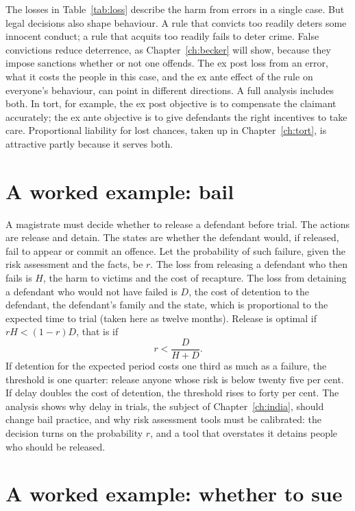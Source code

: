 The losses in Table~\ref{tab:loss} describe the harm from errors in a single case. But legal decisions also shape behaviour. A rule that convicts too readily deters some innocent conduct; a rule that acquits too readily fails to deter crime. False convictions reduce deterrence, as Chapter~\ref{ch:becker} will show, because they impose sanctions whether or not one offends. The ex post loss from an error, what it costs the people in this case, and the ex ante effect of the rule on everyone's behaviour, can point in different directions. A full analysis includes both. In tort, for example, the ex post objective is to compensate the claimant accurately; the ex ante objective is to give defendants the right incentives to take care. Proportional liability for lost chances, taken up in Chapter~\ref{ch:tort}, is attractive partly because it serves both.

\section{A worked example: bail}

A magistrate must decide whether to release a defendant before trial. The actions are release and detain. The states are whether the defendant would, if released, fail to appear or commit an offence. Let the probability of such failure, given the risk assessment and the facts, be $r$. The loss from releasing a defendant who then fails is $H$, the harm to victims and the cost of recapture. The loss from detaining a defendant who would not have failed is $D$, the cost of detention to the defendant, the defendant's family and the state, which is proportional to the expected time to trial (taken here as twelve months). Release is optimal if $rH < (1-r)D$, that is if
\begin{equation}
r < \frac{D}{H + D}.
\end{equation}
If detention for the expected period costs one third as much as a failure, the threshold is one quarter: release anyone whose risk is below twenty five per cent. If delay doubles the cost of detention, the threshold rises to forty per cent. The analysis shows why delay in trials, the subject of Chapter~\ref{ch:india}, should change bail practice, and why risk assessment tools must be calibrated: the decision turns on the probability $r$, and a tool that overstates it detains people who should be released.

\section{A worked example: whether to sue}

